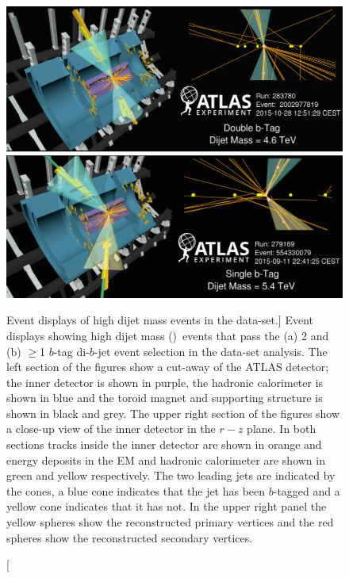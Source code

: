 \begin{figure}[!ht]
  \begin{center}
    \captionsetup[subfigure]{aboveskip=0pt,justification=centering}
        {\includegraphics[width=0.99\linewidth, angle=0]{figs/Dibjet/Gen/evt-vp1_bb_edit.png}\vspace{2mm} }\\
              {\includegraphics[width=0.99\linewidth, angle=0]{figs/Dibjet/Gen/evt-vp1_b.png}\vspace{2mm} }
  \end{center}
  \caption
      [Event displays of high dijet mass events in the \summer{} data-set.]
      {Event displays showing high dijet mass (\mjj{})~events that pass the (a) 2 and (b) $\geq$1 $b$-tag di-$b$-jet event selection in the \summer{} data-set analysis.
        The left section of the figures show a cut-away of the ATLAS detector;
        the inner detector is shown in purple, the hadronic calorimeter is shown in blue
        and the toroid magnet and supporting structure is shown in black and grey.
        The upper right section of the figures show a close-up view of the inner detector in the $r-z$ plane.
        In both sections tracks inside the inner detector are shown in orange
        and energy deposits in the EM and hadronic calorimeter are shown in green and yellow respectively.
        The two leading jets are indicated by the cones, a blue cone indicates that the jet has been
        $b$-tagged and a yellow cone indicates that it has not.
        In the upper right panel the yellow spheres show the reconstructed primary vertices and the red spheres show the reconstructed secondary vertices.
      }
  \label{fig:evt-vp1}
\end{figure}

